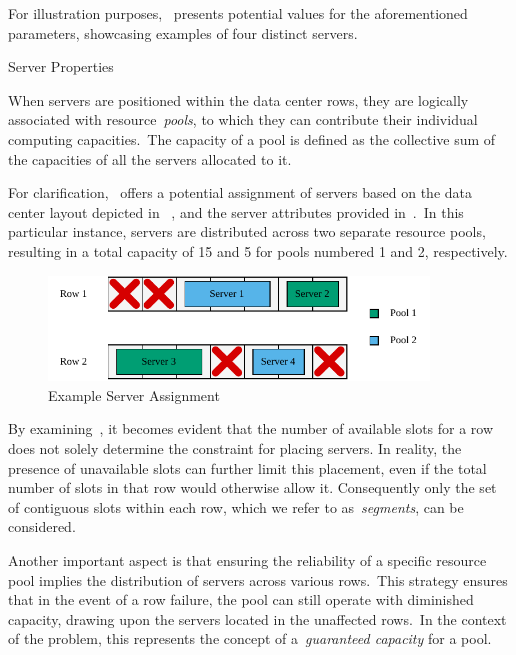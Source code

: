 For illustration purposes,~ presents potential
values for the aforementioned parameters, showcasing examples of four distinct
servers.

\begin{table}[ht]
  \centering
  
  \caption{Server Properties}
  \label{tab:dc-example-properties}
\end{table}

When servers are positioned within the data center rows, they are
logically associated with resource~\textit{pools}, to which they can contribute
their individual computing capacities.~The capacity of a pool is defined as the
collective sum of the capacities of all the servers allocated to it.

For clarification,~ offers a potential
assignment of servers based on the data center layout depicted in
~, and the server attributes provided
in~.~In this particular instance, servers are
distributed across two separate resource pools, resulting in a total capacity of
15 and 5 for pools numbered 1 and 2, respectively.

\begin{figure}[h]
  \centering
  \includegraphics[width=0.9\textwidth,keepaspectratio]{../assets/dc/dc-example.pdf}
  \caption{Example Server Assignment}
  \label{fig:data-center-layout-with-servers}
\end{figure}

By examining~, it becomes evident that
the number of available slots for a row does not solely determine the constraint
for placing servers. In reality, the presence of unavailable slots can further
limit this placement, even if the total number of slots in that row would
otherwise allow it. Consequently only the set of contiguous slots within each
row, which we refer to as~\emph{segments}, can be considered.

Another important aspect is that ensuring the reliability of a specific
resource pool implies the distribution of servers across various rows.~This
strategy ensures that in the event of a row failure, the pool can still operate
with diminished capacity, drawing upon the servers located in the unaffected
rows.~In the context of the problem, this represents the concept of
a~\textit{guaranteed capacity} for a pool.

